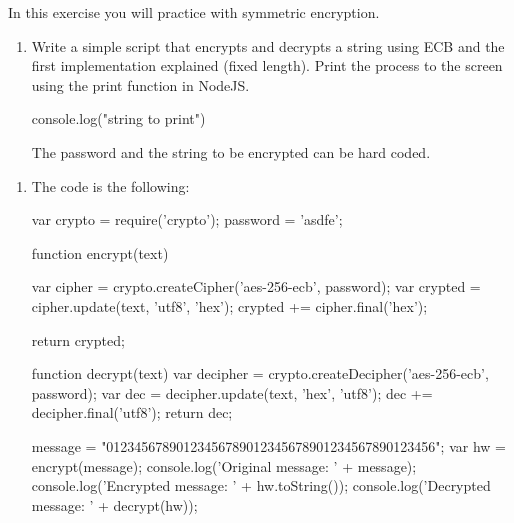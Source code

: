 
\begin{Exercise}[label={basic-js-crypto-aes}]
In this exercise you will practice with symmetric encryption.

\begin{enumerate}[1.]
\item Write a simple script that encrypts and decrypts a string using ECB and the first implementation explained (fixed length).
Print the process to the screen using the print function in NodeJS.
\begin{js}
  console.log("string to print")
\end{js}
The password and the string to be encrypted can be hard coded.
\end{enumerate}

\end{Exercise}

\begin{Answer}[ref={basic-js-crypto-aes}]
\begin{enumerate}[1.]
\item The code is the following: 

\begin{js}
var crypto = require('crypto');
password = 'asdfe';

function encrypt(text) {
    var cipher = crypto.createCipher('aes-256-ecb', password);
    var crypted = cipher.update(text, 'utf8', 'hex');
    crypted += cipher.final('hex');

    return crypted;
}

function decrypt(text) {
    var decipher = crypto.createDecipher('aes-256-ecb', password);
    var dec = decipher.update(text, 'hex', 'utf8');
    dec += decipher.final('utf8');
    return dec;
}

message = "01234567890123456789012345678901234567890123456";
var hw = encrypt(message);
console.log('Original message: ' + message);
console.log('Encrypted message: ' + hw.toString());
console.log('Decrypted message: ' + decrypt(hw));
\end{js}

\end{enumerate}
\end{Answer}
